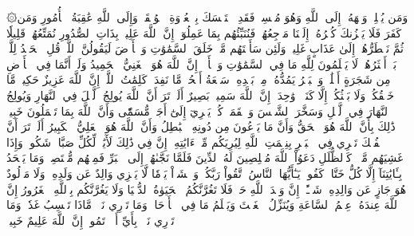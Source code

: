 ۞وَمَن يُسۡلِمۡ وَجۡهَهُۥٓ إِلَى ٱللَّهِ وَهُوَ مُحۡسِنٞ فَقَدِ ٱسۡتَمۡسَكَ بِٱلۡعُرۡوَةِ ٱلۡوُثۡقَىٰۗ وَإِلَى ٱللَّهِ عَٰقِبَةُ ٱلۡأُمُورِ
وَمَن كَفَرَ فَلَا يَحۡزُنكَ كُفۡرُهُۥٓۚ إِلَيۡنَا مَرۡجِعُهُمۡ فَنُنَبِّئُهُم بِمَا عَمِلُوٓاْۚ إِنَّ ٱللَّهَ عَلِيمُۢ بِذَاتِ ٱلصُّدُورِ
نُمَتِّعُهُمۡ قَلِيلٗا ثُمَّ نَضۡطَرُّهُمۡ إِلَىٰ عَذَابٍ غَلِيظٖ
وَلَئِن سَأَلۡتَهُم مَّنۡ خَلَقَ ٱلسَّمَٰوَٰتِ وَٱلۡأَرۡضَ لَيَقُولُنَّ ٱللَّهُۚ قُلِ ٱلۡحَمۡدُ لِلَّهِۚ بَلۡ أَكۡثَرُهُمۡ لَا يَعۡلَمُونَ
لِلَّهِ مَا فِي ٱلسَّمَٰوَٰتِ وَٱلۡأَرۡضِۚ إِنَّ ٱللَّهَ هُوَ ٱلۡغَنِيُّ ٱلۡحَمِيدُ
وَلَوۡ أَنَّمَا فِي ٱلۡأَرۡضِ مِن شَجَرَةٍ أَقۡلَٰمٞ وَٱلۡبَحۡرُ يَمُدُّهُۥ مِنۢ بَعۡدِهِۦ سَبۡعَةُ أَبۡحُرٖ مَّا نَفِدَتۡ كَلِمَٰتُ ٱللَّهِۚ إِنَّ ٱللَّهَ عَزِيزٌ حَكِيمٞ
مَّا خَلۡقُكُمۡ وَلَا بَعۡثُكُمۡ إِلَّا كَنَفۡسٖ وَٰحِدَةٍۚ إِنَّ ٱللَّهَ سَمِيعُۢ بَصِيرٌ
أَلَمۡ تَرَ أَنَّ ٱللَّهَ يُولِجُ ٱلَّيۡلَ فِي ٱلنَّهَارِ وَيُولِجُ ٱلنَّهَارَ فِي ٱلَّيۡلِ وَسَخَّرَ ٱلشَّمۡسَ وَٱلۡقَمَرَۖ كُلّٞ يَجۡرِيٓ إِلَىٰٓ أَجَلٖ مُّسَمّٗى وَأَنَّ ٱللَّهَ بِمَا تَعۡمَلُونَ خَبِيرٞ
ذَٰلِكَ بِأَنَّ ٱللَّهَ هُوَ ٱلۡحَقُّ وَأَنَّ مَا يَدۡعُونَ مِن دُونِهِ ٱلۡبَٰطِلُ وَأَنَّ ٱللَّهَ هُوَ ٱلۡعَلِيُّ ٱلۡكَبِيرُ
أَلَمۡ تَرَ أَنَّ ٱلۡفُلۡكَ تَجۡرِي فِي ٱلۡبَحۡرِ بِنِعۡمَتِ ٱللَّهِ لِيُرِيَكُم مِّنۡ ءَايَٰتِهِۦٓۚ إِنَّ فِي ذَٰلِكَ لَأٓيَٰتٖ لِّكُلِّ صَبَّارٖ شَكُورٖ
وَإِذَا غَشِيَهُم مَّوۡجٞ كَٱلظُّلَلِ دَعَوُاْ ٱللَّهَ مُخۡلِصِينَ لَهُ ٱلدِّينَ فَلَمَّا نَجَّىٰهُمۡ إِلَى ٱلۡبَرِّ فَمِنۡهُم مُّقۡتَصِدٞۚ وَمَا يَجۡحَدُ بِـَٔايَٰتِنَآ إِلَّا كُلُّ خَتَّارٖ كَفُورٖ
يَـٰٓأَيُّهَا ٱلنَّاسُ ٱتَّقُواْ رَبَّكُمۡ وَٱخۡشَوۡاْ يَوۡمٗا لَّا يَجۡزِي وَالِدٌ عَن وَلَدِهِۦ وَلَا مَوۡلُودٌ هُوَ جَازٍ عَن وَالِدِهِۦ شَيۡـًٔاۚ إِنَّ وَعۡدَ ٱللَّهِ حَقّٞۖ فَلَا تَغُرَّنَّكُمُ ٱلۡحَيَوٰةُ ٱلدُّنۡيَا وَلَا يَغُرَّنَّكُم بِٱللَّهِ ٱلۡغَرُورُ
إِنَّ ٱللَّهَ عِندَهُۥ عِلۡمُ ٱلسَّاعَةِ وَيُنَزِّلُ ٱلۡغَيۡثَ وَيَعۡلَمُ مَا فِي ٱلۡأَرۡحَامِۖ وَمَا تَدۡرِي نَفۡسٞ مَّاذَا تَكۡسِبُ غَدٗاۖ وَمَا تَدۡرِي نَفۡسُۢ بِأَيِّ أَرۡضٖ تَمُوتُۚ إِنَّ ٱللَّهَ عَلِيمٌ خَبِيرُۢ